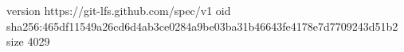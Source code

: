 version https://git-lfs.github.com/spec/v1
oid sha256:465df11549a26cd6d4ab3ce0284a9be03ba31b46643fe4178e7d7709243d51b2
size 4029
